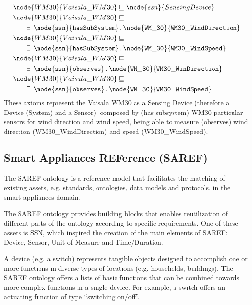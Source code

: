 \documentclass{sig-alternate-05-2015}
\newcommand{\erestr}[2]{\exists\;\,{\tt #1}\,.\,{\tt #2}}
\begin{document}
\begin{align*}
  \begin{aligned}
	&\node{WM30}{Vaisala\_WM30} \sqsubseteq \node{ssn}{SensingDevice}\\
	&\node{WM30}{Vaisala\_WM30} \sqsubseteq\\
	&\qquad\erestr{\node{ssn}{hasSubSystem}}{\node{WM\_30}{WM30\_WindDirection}}\\
	&\node{WM30}{Vaisala\_WM30} \sqsubseteq\\
	&\qquad\erestr{\node{ssn}{hasSubSystem}}{\node{WM\_30}{WM30\_WindSpeed}}\\	
	&\node{WM30}{Vaisala\_WM30} \sqsubseteq\\
	&\qquad\erestr{\node{ssn}{observes}}{\node{WM\_30}{WM30\_WinDirection}}\\
	&\node{WM30}{Vaisala\_WM30} \sqsubseteq\\
	&\qquad\erestr{\node{ssn}{observes}}{\node{WM\_30}{WM30\_WindSpeed}}\\
  \end{aligned}\\
\end{align*}
These axioms represent the Vaisala WM30 as a Sensing Device (therefore a Device (System) and a Sensor), composed by (has subsystem) WM30 particular sensors for wind direction and wind speed, being able to measure (observes) wind direction (WM30\_WindDirection) and speed (WM30\_WindSpeed). 

\subsection{Smart Appliances REFerence (SAREF)}
The SAREF ontology \cite{Daniele2015,Daniele2016} is a reference model that facilitates the matching of existing assets, e.g. standards, ontologies, data models and protocols, in the smart appliances domain. 

The SAREF ontology provides building blocks that enables reutilization of different parts of the ontology according to specific requirements. One of these assets is SSN, which inspired the creation of the main elements of SAREF: Device, Sensor, Unit of Measure and Time/Duration. 

A device (e.g. a switch) represents tangible objects designed to accomplish one or more functions in diverse types of locations (e.g. households, buildings). The SAREF ontology offers a lists of basic functions that can be combined towards more complex functions in a single device. For example, a switch offers an actuating function of type “switching on/off”. 
\end{document}
